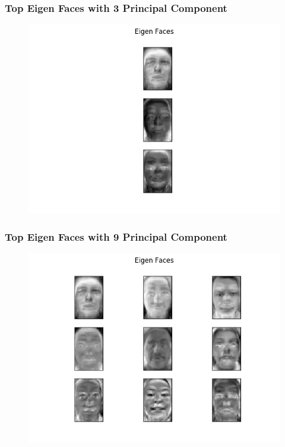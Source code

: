 \documentclass[11pt]{beamer}
\begin{document}
\begin{frame}
\frametitle{Top Eigen Faces with 3 Principal Component}
\begin{figure}
\includegraphics[width=.95\textwidth]{eigen_face_U_3.png}
\end{figure}
\end{frame}

\begin{frame}
\frametitle{Top Eigen Faces with 9 Principal Component}
\begin{figure}
\includegraphics[width=.95\textwidth]{eigen_face_U_9.png}
\end{figure}
\end{frame}
\end{document}
